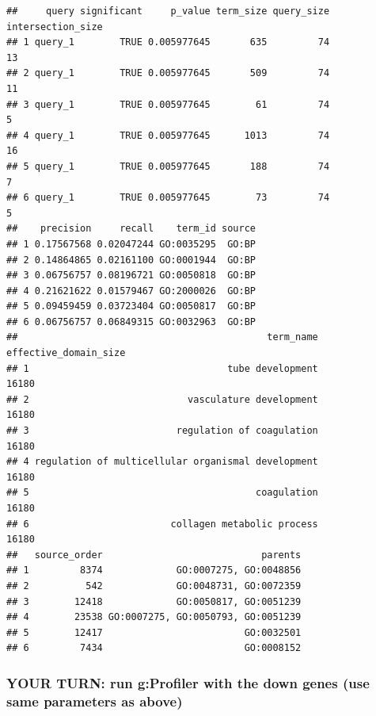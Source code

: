 \documentclass[
]{book}
\begin{document}
\begin{verbatim}
##     query significant     p_value term_size query_size intersection_size
## 1 query_1        TRUE 0.005977645       635         74                13
## 2 query_1        TRUE 0.005977645       509         74                11
## 3 query_1        TRUE 0.005977645        61         74                 5
## 4 query_1        TRUE 0.005977645      1013         74                16
## 5 query_1        TRUE 0.005977645       188         74                 7
## 6 query_1        TRUE 0.005977645        73         74                 5
##    precision     recall    term_id source
## 1 0.17567568 0.02047244 GO:0035295  GO:BP
## 2 0.14864865 0.02161100 GO:0001944  GO:BP
## 3 0.06756757 0.08196721 GO:0050818  GO:BP
## 4 0.21621622 0.01579467 GO:2000026  GO:BP
## 5 0.09459459 0.03723404 GO:0050817  GO:BP
## 6 0.06756757 0.06849315 GO:0032963  GO:BP
##                                            term_name effective_domain_size
## 1                                   tube development                 16180
## 2                            vasculature development                 16180
## 3                          regulation of coagulation                 16180
## 4 regulation of multicellular organismal development                 16180
## 5                                        coagulation                 16180
## 6                         collagen metabolic process                 16180
##   source_order                            parents
## 1         8374             GO:0007275, GO:0048856
## 2          542             GO:0048731, GO:0072359
## 3        12418             GO:0050817, GO:0051239
## 4        23538 GO:0007275, GO:0050793, GO:0051239
## 5        12417                         GO:0032501
## 6         7434                         GO:0008152
\end{verbatim}

\subsubsection{YOUR TURN: run g:Profiler with the down genes (use same parameters as above)}\label{your-turn-run-gprofiler-with-the-down-genes-use-same-parameters-as-above}
\end{document}
